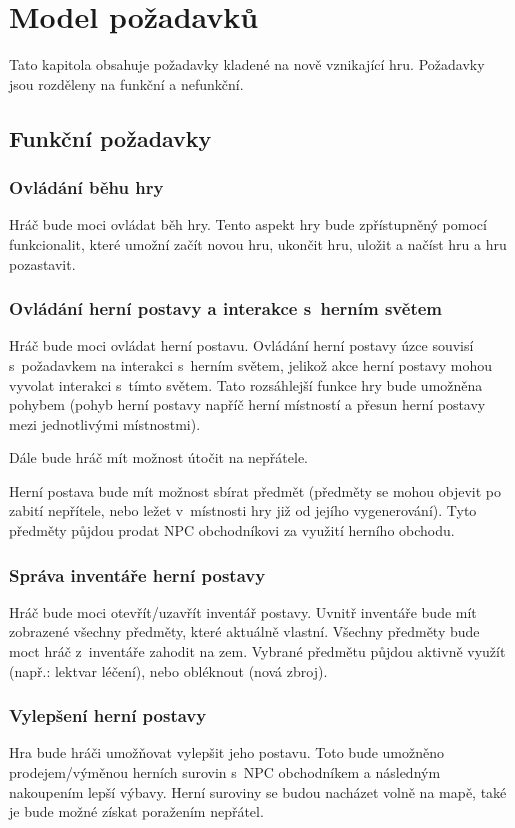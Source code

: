\documentclass[12pt,a4paper]{article}
\begin{document}
\newpage

\section{Model požadavků}
Tato kapitola obsahuje požadavky kladené na nově vznikající hru. Požadavky jsou
rozděleny na funkční a nefunkční.

\subsection{Funkční požadavky}

\subsubsection{Ovládání běhu hry}
Hráč bude moci ovládat běh hry. Tento aspekt hry bude zpřístupněný pomocí
funkcionalit, které umožní začít novou hru, ukončit hru, uložit a načíst hru a
hru pozastavit.

\subsubsection{Ovládání herní postavy a interakce s~herním světem}
Hráč bude moci ovládat herní postavu. Ovládání herní postavy úzce souvisí
s~požadavkem na interakci s~herním světem, jelikož akce herní postavy mohou vyvolat
interakci s~tímto světem. Tato rozsáhlejší funkce hry bude umožněna pohybem
(pohyb herní postavy napříč herní místností a přesun herní postavy mezi
jednotlivými místnostmi).  

Dále bude hráč mít možnost útočit na nepřátele.  

Herní postava bude mít možnost sbírat předmět (předměty se mohou objevit po
zabití nepřítele, nebo ležet v~místnosti hry již od jejího vygenerování). Tyto
předměty půjdou prodat NPC obchodníkovi za využití herního obchodu.

\subsubsection{Správa inventáře herní postavy}
Hráč bude moci otevřít/uzavřít inventář postavy. Uvnitř inventáře bude mít
zobrazené všechny předměty, které aktuálně vlastní. Všechny předměty bude moct
hráč z~inventáře zahodit na zem. Vybrané předmětu půjdou aktivně využít (např.:
lektvar léčení), nebo obléknout (nová zbroj).

\subsubsection{Vylepšení herní postavy}
Hra bude hráči umožňovat vylepšit jeho postavu. Toto bude umožněno
prodejem/výměnou herních surovin s~NPC obchodníkem a následným nakoupením lepší
výbavy.  Herní suroviny se budou nacházet volně na mapě, také je bude možné
získat poražením nepřátel.
\end{document}
